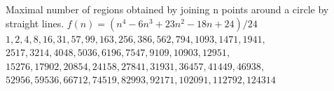 Maximal number of regions obtained by joining n points around
a circle by straight lines. \newline
$f(n)=(n^4-6n^3+23n^2-18n+24)/24$\newline
$1,2,4,8,16,31,57,99,163,256,386,562,794,1093,1471,1941,$ \\
$2517,3214,4048,5036,6196,7547,9109,10903,12951,$\\
$15276,17902,20854,24158,27841,31931,36457,41449,46938,$\\
$52956,59536,66712,74519,82993,92171,102091,112792,124314$

